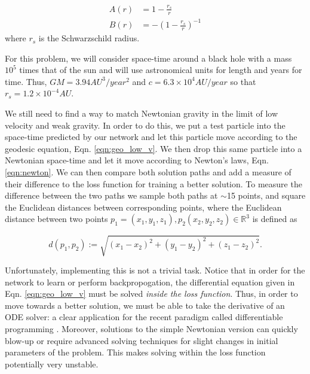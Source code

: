 \documentclass{CUP-JNL-DTM}%
\theoremstyle{definition}
\numberwithin{equation}{section}
\begin{document}
\begin{equation}
\begin{split}
    A(r) & = 1 - \frac{r_s}{r} \\ 
    B(r) & = -\left(1 - \frac{r_s}{r}\right)^{-1}
\end{split}
\end{equation}
where $r_s$ is the Schwarzschild radius. 

For this problem, we will consider space-time around a black hole with a mass $10^5$ times that of the sun and will use astronomical units for length and years for time. Thus, $GM = 3.94\si{AU^{3}/year^2}$ and $c = 6.3 \times 10^4 \si{AU/year}$ so that $r_s = 1.2 \times 10^{-4} \si{AU}$. 

We still need to find a way to match Newtonian gravity in the limit of low velocity and weak gravity. In order to do this, we put a test particle into the space-time predicted by our network and let this particle move according to the geodesic equation, Eqn. \ref{eqn:geo_low_v}. We then drop this same particle into a Newtonian space-time and let it move according to Newton's laws, Eqn. \ref{eqn:newton}. We can then compare both solution paths and add a measure of their difference to the loss function for training a better solution. To measure the difference between the two paths we sample both paths at $\sim$15 points, and square the Euclidean distances between corresponding points, where the Euclidean distance between two points $p_1=(x_1,y_1,z_1),p_2(x_2,y_2,z_2) \in \mathbb{R}^3$ is defined as 

\begin{equation}
    d(p_1,p_2) := \sqrt{(x_1 - x_2)^2 + (y_1 - y_2)^2 + (z_1 - z_2)^2}. 
\end{equation}

Unfortunately, implementing this is not a trivial task. Notice that in order for the network to learn or perform backpropogation, the differential equation given in Eqn. \ref{eqn:geo_low_v} must be solved \emph{inside the loss function}. Thus, in order to move towards a better solution, we must be able to take the derivative of an ODE solver: a clear application for the recent paradigm called differentiable programming \cite{innesDifferentiableProgrammingSystem2019,baydinAutomaticDifferentiationMachine2018}. Moreover, solutions to the simple Newtonian version can quickly blow-up or require advanced solving techniques for slight changes in initial parameters of the problem. This makes solving within the loss function potentially very unstable. 
\end{document}
